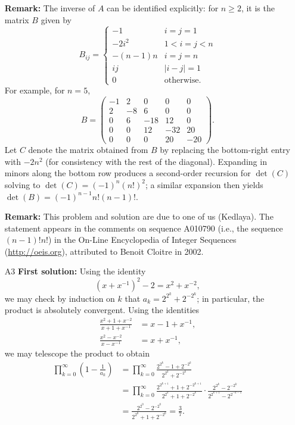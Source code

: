 \documentclass[amssymb,twocolumn,pra,10pt,aps]{revtex4-1}
\begin{document}
\begin{itemize}
\noindent
\textbf{Remark:}
The inverse of $A$ can be identified explicitly: for $n \geq 2$, it is the matrix $B$ given by
\[
B_{ij} = \begin{cases} -1 & i=j=1 \\
-2i^2 & 1 < i=j< n \\
-(n-1)n & i=j=n \\
ij & |i-j|=1 \\
0 & \mbox{otherwise.} \end{cases}
\]
For example, for $n=5$,
\[
B = \begin{pmatrix}
-1 & 2 & 0 & 0 & 0 \\
2 & -8 & 6 & 0 & 0 \\
0 & 6 & -18 & 12 & 0 \\
0 & 0 & 12 & -32 & 20 \\
0 & 0 & 0 & 20 & -20
\end{pmatrix}.
\]
Let $C$ denote the matrix obtained from $B$ by replacing the bottom-right entry with $-2n^2$ (for consistency with the rest of the diagonal).
Expanding in minors along the bottom row produces a second-order recursion for $\det(C)$ solving to $\det(C) = (-1)^n (n!)^2$; a similar expansion then yields $\det(B) = (-1)^{n-1} n! (n-1)!$.

\noindent
\textbf{Remark:}
This problem and solution are due to one of us (Kedlaya). The statement appears in the comments on sequence A010790 (i.e., the sequence $(n-1)! n!$)
in the On-Line Encyclopedia of Integer Sequences (\url{http://oeis.org}),
attributed to Benoit Cloitre in 2002.

\item[A3]
\textbf{First solution:}
Using the identity
\[
(x + x^{-1})^2 - 2 = x^2 + x^{-2},
\]
we may check by induction on $k$ that $a_k = 2^{2^k} + 2^{-2^k}$; in particular, the product is absolutely convergent.
Using the identities
\begin{align*}
\frac{x^2 + 1 + x^{-2}}{x + 1 + x^{-1}} &= x  - 1 + x^{-1}, \\
\frac{x^2 - x^{-2}}{x - x^{-1}} &= x + x^{-1},
\end{align*}
we may telescope the product to obtain
\begin{align*}
\prod_{k=0}^\infty \left( 1 - \frac{1}{a_k} \right)
&= \prod_{k=0}^\infty \frac{2^{2^k} - 1 + 2^{-2^k}}{2^{2^k} + 2^{-2^k}} \\
&= \prod_{k=0}^\infty \frac{2^{2^{k+1}} + 1 + 2^{-2^{k+1}}}{2^{2^k} + 1 + 2^{-2^k}} \cdot
 \frac{2^{2^k} - 2^{-2^k}}{2^{2^{k+1}} - 2^{2^{-k-1}}} \\
&= \frac{2^{2^0} - 2^{-2^0}}{2^{2^0}+1 + 2^{-2^0}} = \frac{3}{7}.
\end{align*}


\end{itemize}
\end{document}
